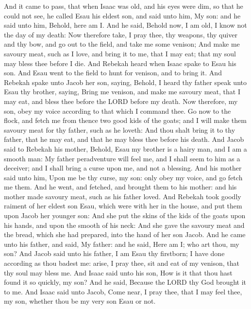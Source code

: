 \begin{biblechapter} %
\verse And it came to pass, that when Isaac was old, and his eyes were dim, so that he could not see, he called Esau his eldest son, and said unto him, My son: and he said unto him, Behold, here am I.
\verse And he said, Behold now, I am old, I know not the day of my death:
\verse Now therefore take, I pray thee, thy weapons, thy quiver and thy bow, and go out to the field, and take me some venison;
\verse And make me savoury meat, such as I love, and bring it to me, that I may eat; that my soul may bless thee before I die.
\verse And Rebekah heard when Isaac spake to Esau his son. And Esau went to the field to hunt for venison, and to bring it.
\verse And Rebekah spake unto Jacob her son, saying, Behold, I heard thy father speak unto Esau thy brother, saying,
\verse Bring me venison, and make me savoury meat, that I may eat, and bless thee before the LORD before my death.
\verse Now therefore, my son, obey my voice according to that which I command thee.
\verse Go now to the flock, and fetch me from thence two good kids of the goats; and I will make them savoury meat for thy father, such as he loveth:
\verse And thou shalt bring it to thy father, that he may eat, and that he may bless thee before his death.
\verse And Jacob said to Rebekah his mother, Behold, Esau my brother is a hairy man, and I am a smooth man:
\verse My father peradventure will feel me, and I shall seem to him as a deceiver; and I shall bring a curse upon me, and not a blessing.
\verse And his mother said unto him, Upon me be thy curse, my son: only obey my voice, and go fetch me them.
\verse And he went, and fetched, and brought them to his mother: and his mother made savoury meat, such as his father loved.
\verse And Rebekah took goodly raiment of her eldest son Esau, which were with her in the house, and put them upon Jacob her younger son:
\verse And she put the skins of the kids of the goats upon his hands, and upon the smooth of his neck:
\verse And she gave the savoury meat and the bread, which she had prepared, into the hand of her son Jacob.
\verse And he came unto his father, and said, My father: and he said, Here am I; who art thou, my son?
\verse And Jacob said unto his father, I am Esau thy firstborn; I have done according as thou badest me: arise, I pray thee, sit and eat of my venison, that thy soul may bless me.
\verse And Isaac said unto his son, How is it that thou hast found it so quickly, my son? And he said, Because the LORD thy God brought it to me.
\verse And Isaac said unto Jacob, Come near, I pray thee, that I may feel thee, my son, whether thou be my very son Esau or not.

\end{biblechapter}
